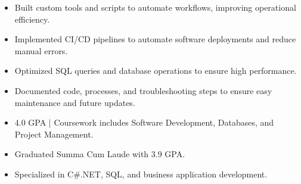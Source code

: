 \par\smallskip
\noindent
\begin{minipage}{20cm}
  \begin{minipage}{9.75cm}
    \begin{itemize}
      \item Built custom tools and scripts to automate workflows, improving operational efficiency.
      \item Implemented CI/CD pipelines to automate software deployments and reduce manual errors.
    \end{itemize}
  \end{minipage}
  \hfill
  \begin{minipage}{9.75cm}
    \begin{itemize}
      \item Optimized SQL queries and database operations to ensure high performance.
      \item Documented code, processes, and troubleshooting steps to ensure easy maintenance and future updates.
    \end{itemize}
  \end{minipage}
\end{minipage}
\par\smallskip
\divider

\begin{itemize}
  \item 4.0 GPA | Coursework includes Software Development, Databases, and Project Management.
\end{itemize}
\divider

\begin{itemize}
  \item Graduated Summa Cum Laude with 3.9 GPA.
  \item Specialized in C#.NET, SQL, and business application development.
\end{itemize}

\noindent
\begin{minipage}{20cm}
\end{minipage}


